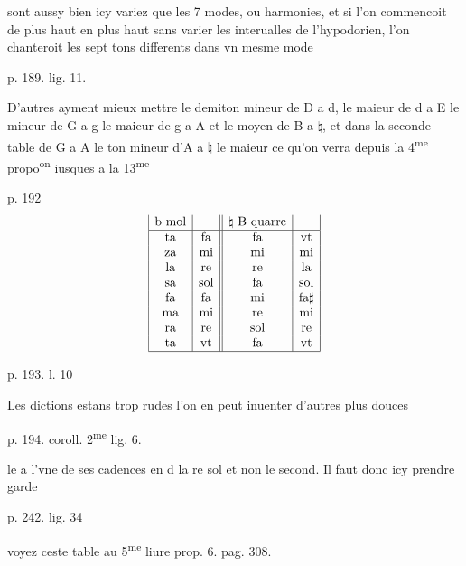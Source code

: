 \documentclass[11pt,a4paper]{article}
\begin{document}

sont aussy bien icy variez que les 7 modes, ou harmonies, et si l'on commencoit de plus haut en plus haut sans varier les interualles de l'hypodorien, l'on chanteroit les sept tons differents dans vn mesme mode

p. 189. lig. 11.

D'autres ayment mieux mettre le demiton mineur de D a d, le maieur de d a E le mineur de G a g le maieur de g a A et le moyen de B a $\natural$, et dans la seconde table de G a A le ton mineur d'A a $\natural$ le maieur ce qu'on verra depuis la 4\textsuperscript{me} propo\textsuperscript{on} iusques a la 13\textsuperscript{me}

p. 192
\[
\begin{array}{|c|c||c|c|}
\text{b mol} & & \natural\ \text{B quarre} & \\ \hline
\text{ta} & \text{fa} & \text{fa} & \text{vt} \\
\text{za} & \text{mi} & \text{mi} & \text{mi} \\
\text{la} & \text{re} & \text{re} & \text{la} \\
\text{sa} & \text{sol} & \text{fa} & \text{sol} \\
\text{fa} & \text{fa} & \text{mi} & \text{fa}\sharp \\
\text{ma} & \text{mi} & \text{re} & \text{mi} \\
\text{ra} & \text{re} & \text{sol} & \text{re} \\
\text{ta} & \text{vt} & \text{fa} & \text{vt} \\ \hline
\end{array}
\]

p. 193. l. 10

Les dictions estans trop rudes l'on en peut inuenter d'autres plus douces

p. 194. coroll. 2\textsuperscript{me} lig. 6.

le  a l'vne de ses cadences en d la re sol et non le second. Il faut donc icy prendre garde

p. 242. lig. 34

voyez ceste table au 5\textsuperscript{me} liure prop. 6. pag. 308.
\end{document}
